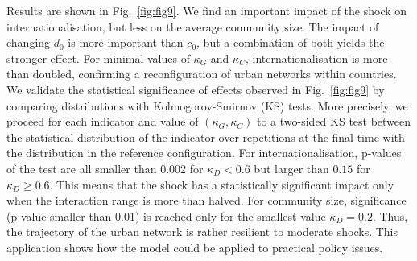 \documentclass[10pt,letterpaper]{article}
\begin{document}
Results are shown in Fig.~\ref{fig:fig9}. We find an important impact of the shock on internationalisation, but less on the average community size. The impact of changing $d_0$ is more important than $c_0$, but a combination of both yields the stronger effect. For minimal values of $\kappa_G$ and $\kappa_C$, internationalisation is more than doubled, confirming a reconfiguration of urban networks within countries. We validate the statistical significance of effects observed in Fig.~\ref{fig:fig9} by comparing distributions with Kolmogorov-Smirnov (KS) tests. More precisely, we proceed for each indicator and value of $(\kappa_G,\kappa_C)$ to a two-sided KS test between the statistical distribution of the indicator over repetitions at the final time with the distribution in the reference configuration. For internationalisation, p-values of the test are all smaller than 0.002 for $\kappa_D < 0.6$ but larger than $0.15$ for $\kappa_D \geq 0.6$. This means that the shock has a statistically significant impact only when the interaction range is more than halved. For community size, significance (p-value smaller than 0.01) is reached only for the smallest value $\kappa_D = 0.2$. Thus, the trajectory of the urban network is rather resilient to moderate shocks. This application shows how the model could be applied to practical policy issues.
\end{document}
